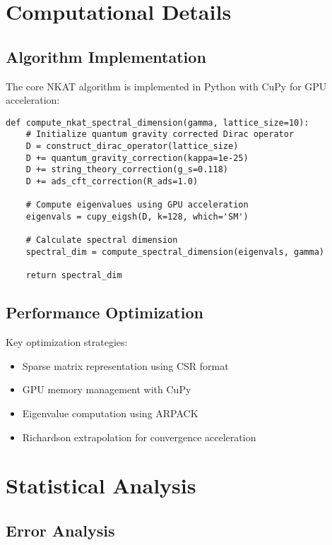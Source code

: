 \documentclass[12pt,a4paper]{article}
\begin{document}
\appendix

\section{Computational Details}

\subsection{Algorithm Implementation}

The core NKAT algorithm is implemented in Python with CuPy for GPU acceleration:

\begin{verbatim}
def compute_nkat_spectral_dimension(gamma, lattice_size=10):
    # Initialize quantum gravity corrected Dirac operator
    D = construct_dirac_operator(lattice_size)
    D += quantum_gravity_correction(kappa=1e-25)
    D += string_theory_correction(g_s=0.118)
    D += ads_cft_correction(R_ads=1.0)
    
    # Compute eigenvalues using GPU acceleration
    eigenvals = cupy_eigsh(D, k=128, which='SM')
    
    # Calculate spectral dimension
    spectral_dim = compute_spectral_dimension(eigenvals, gamma)
    
    return spectral_dim
\end{verbatim}

\subsection{Performance Optimization}

Key optimization strategies:
\begin{itemize}
\item Sparse matrix representation using CSR format
\item GPU memory management with CuPy
\item Eigenvalue computation using ARPACK
\item Richardson extrapolation for convergence acceleration
\end{itemize}

\section{Statistical Analysis}

\subsection{Error Analysis}
\end{document}
